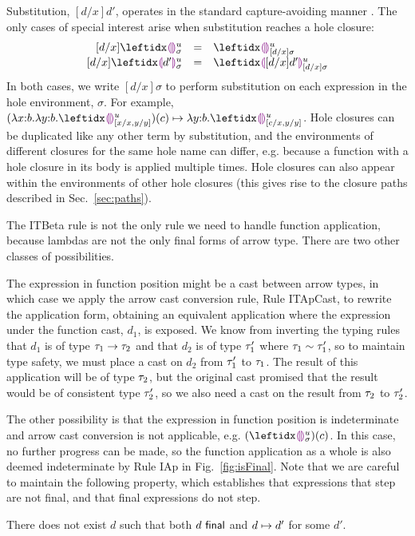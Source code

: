 Substitution, $[d/x]d'$, operates in the standard capture-avoiding manner \cite{pfpl}. 
The only cases of special interest arise when substitution reaches a hole closure:
\[
\begin{array}{rcl}
  [d/x]\dehole{u}{\sigma}{} & = & \dehole{u}{[d/x]\sigma}{} \\%
  \substitute{d}{x}{\dhole{d'}{u}{\sigma}{}} & = & \dhole{[d/x]d'}{u}{[d/x]\sigma}{}
\end{array}
\]
In both cases, we write $[d/x]\sigma$ to perform substitution on each expression in the hole environment, $\sigma$. 
For example, $\stepsToD{}{\hap{(\halam{x}{b}{\halam{y}{b}{\dehole{u}{[x/x, y/y]}{}}})}{c}}{\halam{y}{b}{\dehole{u}{[c/x, y/y]}{}}}$. 
Hole closures can be duplicated like any other term by substitution, and the environments of different closures for the same hole name can differ, e.g. because a function with a hole closure in its body is applied multiple times.%
Hole closures can also appear within the environments of other hole closures (this gives rise to the closure paths described in Sec.~\ref{sec:paths}).

The ITBeta rule is not the only rule we need to handle function application, because lambdas are not the only final forms of arrow type. There are two other classes of possibilities. 

The expression in function position might be a cast between arrow types, in which case we apply the arrow cast conversion rule, Rule {ITApCast}, to rewrite the application form, obtaining an equivalent application where the expression under the function cast, $d_1$, is exposed. 
We know from inverting the typing rules that $d_1$ is of type $\tau_1 \rightarrow \tau_2$ and that $d_2$ is of type $\tau_1'$ where $\tau_1 \sim \tau_1'$, so to maintain type safety, we must place a cast on $d_2$ from  $\tau_1'$ to $\tau_1$. 
The result of this application will be of type $\tau_2$, but the original cast promised that the result would be of consistent type $\tau_2'$, so we also need a cast on the result from $\tau_2$ to $\tau_2'$.

The other possibility is that the expression in function position is indeterminate and arrow cast conversion is not applicable, e.g. $\hap{(\dehole{u}{\sigma}{})}{c}$. 
In this case, no further progress can be made, so the function application as a whole is also deemed indeterminate by Rule {IAp} in Fig.~\ref{fig:isFinal}. 
Note that we are careful to maintain the following property, which establishes that expressions that step are not final, and that final expressions do not step.%
%
\begin{thm}[Finality] There does not exist $d$ such that both $d~\mathsf{final}$ and $d \mapsto d'$ for some $d'$.
\end{thm}

